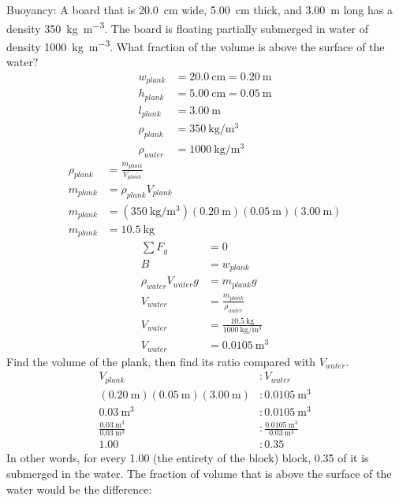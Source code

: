 \documentclass{article}
\begin{document}
Buoyancy: A board that is \SI{20.0}{\centi \meter} wide, \SI{5.00}{\centi \meter} thick, and \SI{3.00}{\meter} long has a density \SI{350}{\kilogram \per \meter \cubed}. The board is floating partially submerged in water of density \SI{1000}{\kilogram \per \meter \cubed}. What fraction of the volume is above the surface of the water?
\begin{align*}
	w_{plank} & = \SI{20.0}{\centi \meter} = \SI{0.20}{\meter} \\
	h_{plank} & = \SI{5.00}{\centi \meter} = \SI{0.05}{\meter} \\
	l_{plank} & = \SI{3.00}{\meter} \\
	\rho_{plank} & = \SI{350}{\kilogram \per \meter \cubed} \\
	\rho_{water} & = \SI{1000}{\kilogram \per \meter \cubed}
\end{align*}
\begin{align*}
	\rho_{plank} & = \frac{ m_{plank} }{ V_{plank} } \\
	m_{plank} & = \rho_{plank}V_{plank} \\
	m_{plank} & = (\SI{350}{\kilogram \per \meter \cubed})(\SI{0.20}{\meter})(\SI{0.05}{\meter})(\SI{3.00}{\meter}) \\
	m_{plank} & = \SI{10.5}{\kilogram}
\end{align*}
\begin{align*}
	\sum F_y & = 0 \\
	B & = w_{plank} \\
	\rho_{water}V_{water}g & = m_{plank}g \\
	V_{water} & = \frac{ m_{plank} }{ \rho_{water} } \\
	V_{water} & = \frac{ \SI{10.5}{\kilogram} }{ \SI{1000}{\kilogram \per \meter \cubed} } \\
	V_{water} & = \SI{0.0105}{\meter \cubed}
\end{align*}
Find the volume of the plank, then find its ratio compared with $ V_{water} $.
\begin{align*}
	V_{plank} & : V_{water} \\
	(\SI{0.20}{\meter})(\SI{0.05}{\meter})(\SI{3.00}{\meter}) & : \SI{0.0105}{\meter \cubed} \\
	\SI{0.03}{\meter \cubed} & : \SI{0.0105}{\meter \cubed} \\
	\frac{ \SI{0.03}{\meter \cubed} }{ \SI{0.03}{\meter \cubed} } & : \frac{ \SI{0.0105}{\meter \cubed} }{ \SI{0.03}{\meter \cubed} } \\
	1.00 & : 0.35
\end{align*}
In other words, for every 1.00 (the entirety of the block) block, 0.35 of it is submerged in the water. The fraction of volume that is above the surface of the water would be the difference:
\end{document}
